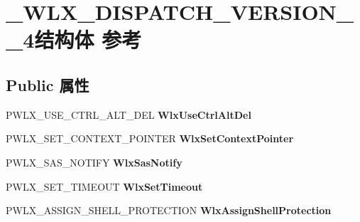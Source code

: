 \hypertarget{struct___w_l_x___d_i_s_p_a_t_c_h___v_e_r_s_i_o_n__1__4}{}\section{\+\_\+\+W\+L\+X\+\_\+\+D\+I\+S\+P\+A\+T\+C\+H\+\_\+\+V\+E\+R\+S\+I\+O\+N\+\_\+\_\+4结构体 参考}
\label{struct___w_l_x___d_i_s_p_a_t_c_h___v_e_r_s_i_o_n__1__4}
\subsection*{Public 属性}
\begin{DoxyCompactItemize}
\item 
\mbox{\label{struct___w_l_x___d_i_s_p_a_t_c_h___v_e_r_s_i_o_n__1__4_a748a4e490f110dd7c764853253e11f51}} 
P\+W\+L\+X\+\_\+\+U\+S\+E\+\_\+\+C\+T\+R\+L\+\_\+\+A\+L\+T\+\_\+\+D\+EL {\bfseries Wlx\+Use\+Ctrl\+Alt\+Del}
\item 
\mbox{\label{struct___w_l_x___d_i_s_p_a_t_c_h___v_e_r_s_i_o_n__1__4_ae19f20fab833c45ac8d69d8c8f5be8b9}} 
P\+W\+L\+X\+\_\+\+S\+E\+T\+\_\+\+C\+O\+N\+T\+E\+X\+T\+\_\+\+P\+O\+I\+N\+T\+ER {\bfseries Wlx\+Set\+Context\+Pointer}
\item 
\mbox{\label{struct___w_l_x___d_i_s_p_a_t_c_h___v_e_r_s_i_o_n__1__4_a68efc5596536b0f7fd752284d7c3b12c}} 
P\+W\+L\+X\+\_\+\+S\+A\+S\+\_\+\+N\+O\+T\+I\+FY {\bfseries Wlx\+Sas\+Notify}
\item 
\mbox{\label{struct___w_l_x___d_i_s_p_a_t_c_h___v_e_r_s_i_o_n__1__4_a197f9c14f0198f182febbff6df65aab1}} 
P\+W\+L\+X\+\_\+\+S\+E\+T\+\_\+\+T\+I\+M\+E\+O\+UT {\bfseries Wlx\+Set\+Timeout}
\item 
\mbox{\label{struct___w_l_x___d_i_s_p_a_t_c_h___v_e_r_s_i_o_n__1__4_aba26477096891ad82fd22fbc78a79cab}} 
P\+W\+L\+X\+\_\+\+A\+S\+S\+I\+G\+N\+\_\+\+S\+H\+E\+L\+L\+\_\+\+P\+R\+O\+T\+E\+C\+T\+I\+ON {\bfseries Wlx\+Assign\+Shell\+Protection}

\end{DoxyCompactItemize}
